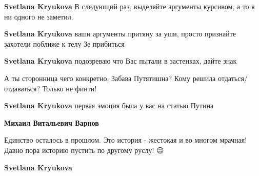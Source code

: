 \begin{itemize}
\begin{itemize}
\textbf{Svetlana Kryukova} В следующий раз, выделяйте аргументы курсивом, а то я ни одного не заметил.

 
\textbf{Svetlana Kryukova} ваши аргументы притяну за уши, просто признайте захотели поближе к телу Зе прибиться

 
\textbf{Svetlana Kryukova} подозреваю что Вас пытали в застенках, дайте знак

 
А ты сторонница чего конкретно, Забава Путятишна? Кому решила отдаться/отдаваться? Только не финти!

 
\textbf{Svetlana Kryukova} первая эмоция была у вас на статью Путина

 
\textbf{Михаил Витальевич Варнов}

Единство осталось в прошлом. Это история - жестокая и во многом мрачная! Давно
пора историю пустить по другому руслу! 😉


 
\textbf{Svetlana Kryukova} 


\end{itemize}
\end{itemize}
